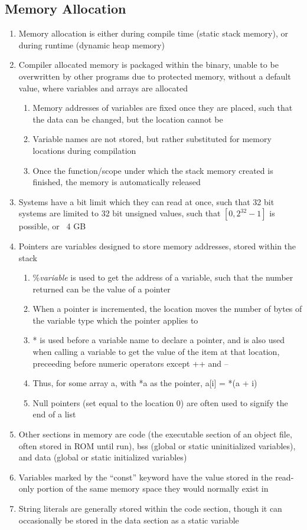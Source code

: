 \documentclass[11 pt, twoside]{article}
\begin{document}
\subsection{Memory Allocation}
\begin{enumerate}
\item Memory allocation is either during compile time (static stack memory), or during runtime (dynamic heap memory)
\item Compiler allocated memory is packaged within the binary, unable to be overwritten by other programs due to protected memory, without a default value, where variables and arrays are allocated
\begin{enumerate}
\item Memory addresses of variables are fixed once they are placed, such that the data can be changed, but the location cannot be
\item Variable names are not stored, but rather substituted for memory locations during compilation
\item Once the function/scope under which the stack memory created is finished, the memory is automatically released
\end{enumerate}
\item Systems have a bit limit which they can read at once, such that 32 bit systems are limited to 32 bit unsigned values, such that $[0, 2^32-1]$ is possible, or ~4 GB 
\item Pointers are variables designed to store memory addresses, stored within the stack
\begin{enumerate}
\item \%\textit{variable} is used to get the address of a variable, such that the number returned can be the value of a pointer 
\item When a pointer is incremented, the location moves the number of bytes of the variable type which the pointer applies to
\item * is used before a variable name to declare a pointer, and is also used when calling a variable to get the value of the item at that location, preceeding before numeric operators except ++ and --
\item Thus, for some array a, with *a as the pointer, a[i] = *(a + i)
\item Null pointers (set equal to the location 0) are often used to signify the end of a list
\end{enumerate}
\item Other sections in memory are code (the executable section of an object file, often stored in ROM until run), bss (global or static uninitialized variables), and data (global or static initialized variables)
\item Variables marked by the ``const'' keyword have the value stored in the read-only portion of the same memory space they would normally exist in
\item String literals are generally stored within the code section, though it can occasionally be stored in the data section as a static variable
\end{enumerate}
\end{document}
